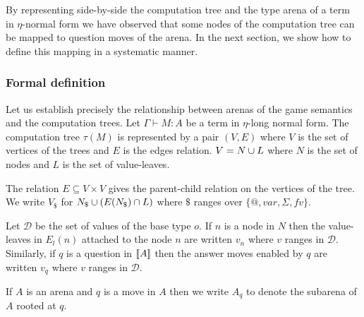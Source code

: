 By representing side-by-side the computation tree and the type arena of a term in $\eta$-normal form we have observed
that some nodes of the computation tree can be mapped to question moves of the arena.
In the next section, we show how to define this mapping in a systematic manner.

\subsubsection{Formal definition}

Let us establish precisely the relationship between arenas of the
game semantics and the computation trees. Let $\Gamma \vdash M : A$
be a term in $\eta$-long normal form. The computation tree $\tau(M)$
is represented by a pair $(V,E)$ where $V$ is the set of vertices of
the trees and $E$ is the edges relation. $V = N \cup L$ where $N$
is the set of nodes and $L$ is the set of value-leaves.

The relation $E \subseteq V \times V$ gives the parent-child relation on the vertices of the tree.
We write $V_\$$ for $N_\$ \cup (E(N_\$) \cap L)$ where $\$$ ranges over $\{@, var, \Sigma, fv \}$.


Let $\mathcal{D}$ be the set of values of the base type $o$. If $n$
is a node in $N$ then the value-leaves in
$E_l(n)$ attached to the node $n$ are written $v_n$ where $v$ ranges in $\mathcal{D}$.
Similarly, if $q$ is a question in ${[\![ A ]\!]}$ then the answer moves
enabled by $q$ are written $v_q$ where $v$ ranges in $\mathcal{D}$.

If $A$ is an arena and $q$ is a move in $A$ then we write $A_q$ to
denote the subarena of $A$ rooted at $q$.

